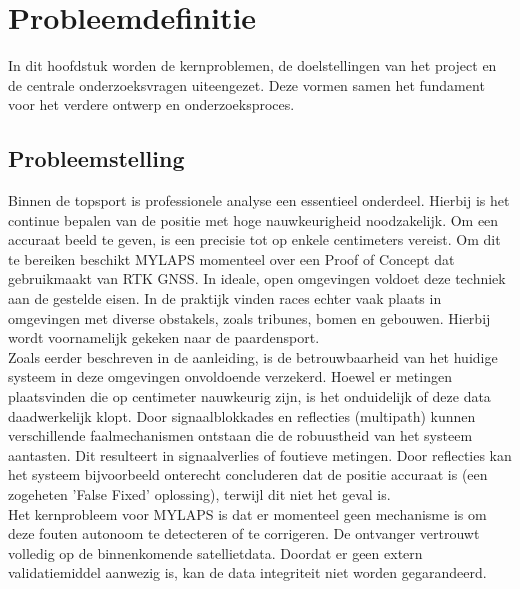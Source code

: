 \section{Probleemdefinitie}
In dit hoofdstuk worden de kernproblemen, de doelstellingen van het project en de centrale onderzoeksvragen uiteengezet. Deze vormen samen het fundament voor het verdere ontwerp en onderzoeksproces.

\subsection{Probleemstelling}
Binnen de topsport is professionele analyse een essentieel onderdeel. Hierbij is het continue bepalen van de positie met hoge nauwkeurigheid noodzakelijk. Om een accuraat beeld te geven, is een precisie tot op enkele centimeters vereist. Om dit te bereiken beschikt MYLAPS momenteel over een Proof of Concept dat gebruikmaakt van RTK GNSS. In ideale, open omgevingen voldoet deze techniek aan de gestelde eisen. In de praktijk vinden races echter vaak plaats in omgevingen met diverse obstakels, zoals tribunes, bomen en gebouwen. Hierbij wordt voornamelijk gekeken naar de paardensport. \\

Zoals eerder beschreven in de aanleiding, is de betrouwbaarheid van het huidige systeem in deze omgevingen onvoldoende verzekerd. Hoewel er metingen plaatsvinden die op centimeter nauwkeurig zijn, is het onduidelijk of deze data daadwerkelijk klopt. Door signaalblokkades en reflecties (multipath) kunnen verschillende faalmechanismen ontstaan die de robuustheid van het systeem aantasten. Dit resulteert in signaalverlies of foutieve metingen. Door reflecties kan het systeem bijvoorbeeld onterecht concluderen dat de positie accuraat is (een zogeheten 'False Fixed' oplossing), terwijl dit niet het geval is. \\

Het kernprobleem voor MYLAPS is dat er momenteel geen mechanisme is om deze fouten autonoom te detecteren of te corrigeren. De ontvanger vertrouwt volledig op de binnenkomende satellietdata. Doordat er geen extern validatiemiddel aanwezig is, kan de data integriteit niet worden gegarandeerd.


